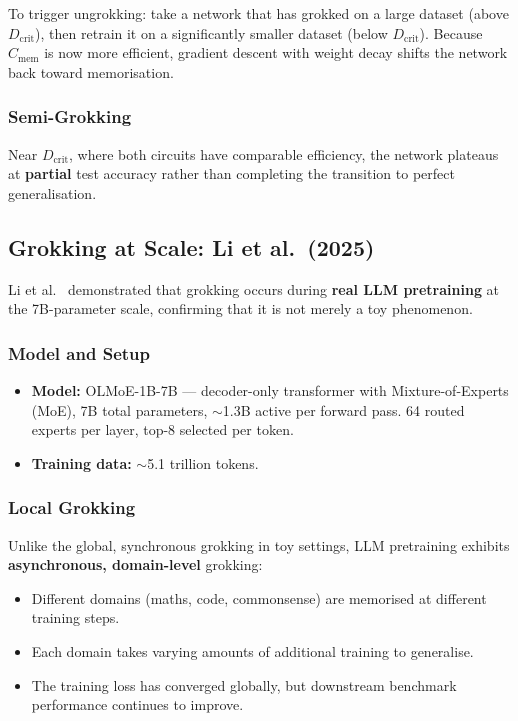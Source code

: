 \documentclass[11pt, a4paper]{article}
\theoremstyle{definition}
\theoremstyle{plain}
\begin{document}
To trigger ungrokking: take a network that has grokked on a large dataset (above $D_{\text{crit}}$), then retrain it on a significantly smaller dataset (below $D_{\text{crit}}$). Because $C_{\text{mem}}$ is now more efficient, gradient descent with weight decay shifts the network back toward memorisation.

\subsubsection{Semi-Grokking}

Near $D_{\text{crit}}$, where both circuits have comparable efficiency, the network plateaus at \textbf{partial} test accuracy rather than completing the transition to perfect generalisation.

\subsection{Grokking at Scale: Li et al.\ (2025)}
\label{subsec:li}

Li et al.~\cite{li2025grokking7b} demonstrated that grokking occurs during \textbf{real LLM pretraining} at the 7B-parameter scale, confirming that it is not merely a toy phenomenon.

\subsubsection{Model and Setup}

\begin{itemize}
  \item \textbf{Model:} OLMoE-1B-7B --- decoder-only transformer with Mixture-of-Experts (MoE), 7B total parameters, ${\sim}$1.3B active per forward pass. 64 routed experts per layer, top-8 selected per token.
  \item \textbf{Training data:} ${\sim}$5.1 trillion tokens.
\end{itemize}

\subsubsection{Local Grokking}

Unlike the global, synchronous grokking in toy settings, LLM pretraining exhibits \textbf{asynchronous, domain-level} grokking:
\begin{itemize}
  \item Different domains (maths, code, commonsense) are memorised at different training steps.
  \item Each domain takes varying amounts of additional training to generalise.
  \item The training loss has converged globally, but downstream benchmark performance continues to improve.
\end{itemize}
\end{document}
